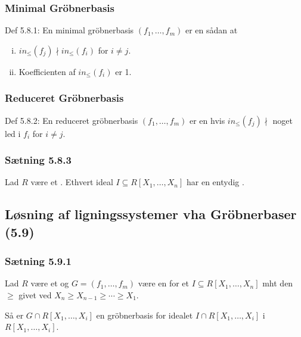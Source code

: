 \subsubsection{Minimal Gröbnerbasis}
\label{Minimal Gröbnerbasis}
Def 5.8.1: En minimal gröbnerbasis $(f_1,\ldots,f_m)$ er en
 sådan at \begin{enumerate}[(i)]
  \item $in_{\leq}(f_j) \nmid in_{\leq}(f_i)$ for $i \neq j$.
  \item Koefficienten af $in_{\leq}(f_i)$ er 1.  
\end{enumerate}

\subsubsection{Reduceret Gröbnerbasis}
\label{Reduceret Gröbnerbasis}
Def 5.8.2: En reduceret gröbnerbasis $(f_1,\ldots,f_m)$ er en  hvis $in_{\leq}(f_j) \nmid$ noget led i $f_i$ for $i \neq j$.

\subsubsection{Sætning 5.8.3}
\label{Saetning 5.8.3}
Lad $R$ være et . Ethvert ideal $I \subseteq R[X_1,\ldots,X_n]$
har en entydig .

\subsection{Løsning af ligningssystemer vha Gröbnerbaser (5.9)}
\label{Loesning af ligningssystemer vha Grobnerbaser (5.9)}
\subsubsection{Sætning 5.9.1}
\label{Saetning 5.9.1}
Lad $R$ være et  og $G = (f_1,\ldots,f_m)$ være en
 for et  $I \subseteq R[X_1,\ldots,X_n]$
mht den  $\geq$ givet ved $X_n \geq X_{n-1}
\geq \cdots \geq X_1$.

Så er $G \cap R[X_1,\ldots,X_i]$ en gröbnerbasis for idealet $I \cap
R[X_1,\ldots,X_i]$ i $R[X_1,\ldots,X_i]$.

